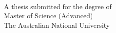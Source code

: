 
\begin{titlepage}
  \enlargethispage{2cm}
  \begin{center}
    \makeatletter
    \Huge\textbf{\@title} \\[.4cm]
    \Huge\textbf{\thesisqualifier} \\[2.5cm]
    \huge\textbf{\@author} \\[9cm]
    \makeatother
    \LARGE A thesis submitted for the degree of \\
    Master of Science (Advanced)\\
    The Australian National University \\[2cm]
    \thismonth
  \end{center}
\end{titlepage}
